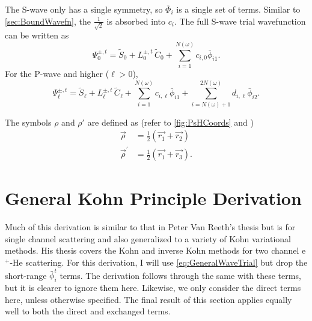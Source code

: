 \documentclass[Dissertation.tex]{subfiles}
\begin{document}
The S-wave only has a single symmetry, so $\bar{\Phi}_i$ is a single set of terms.
Similar to \cref{sec:BoundWavefn}, the $\frac{1}{\sqrt{2}}$ is absorbed into $c_i$. The full S-wave trial wavefunction can be written as
\begin{equation}
  \label{eq:TrialWave}
  \Psi_0^{\pm,t} = \widetilde{S}_0 + L_0^{\pm,t} \, \widetilde{C}_0 + \sum_{i=1}^{N(\omega)} c_{i,0} \bar{\phi}_{i1}.
\end{equation}
For the P-wave and higher ($\ell > 0$), 
\begin{equation}
  \label{eq:TrialWaveHigher}
  \Psi_\ell^{\pm,t} = \widetilde{S}_\ell + L^{\pm,t}_\ell \, \widetilde{C}_\ell
  + \sum_{i=1}^{N(\omega)} c_{i,\ell} \bar{\phi}_{i1}
  + \!\!\!\sum_{i=N(\omega)+1}^{2N(\omega)} \!\! d_{i,\ell} \bar{\phi}_{i2}.
\end{equation}

The symbols $\rho$ and $\rho'$ are defined as (refer to \cref{fig:PsHCoords} and )
\begin{subequations}
\begin{align}
\vec{\rho} &= \frac{1}{2}\left(\vec{r_1} + \vec{r_2}\right) \label{eq:RhoDef}\\
\vec{\rho}^\prime &= \frac{1}{2}\left(\vec{r_1} + \vec{r_3}\right) \label{eq:RhopDef}.
\end{align}
\end{subequations}


\section{General Kohn Principle Derivation}
\label{sec:KohnDerivation}

Much of this derivation is similar to that in Peter Van Reeth's thesis \cite{
VanReethThesis} but is for single channel scattering and also generalized to 
a variety of Kohn variational methods. His thesis covers the Kohn and inverse 
Kohn methods for two channel e$^+$-He scattering. For this derivation, I will 
use \cref{eq:GeneralWaveTrial} but drop the short-range $\bar{\phi}_i^t$ 
terms. The derivation follows through the same with these terms, but it is 
clearer to ignore them here. Likewise, we only consider the direct terms 
here, unless otherwise specified. The final result of this section applies 
equally well to both the direct and exchanged terms.
\end{document}
